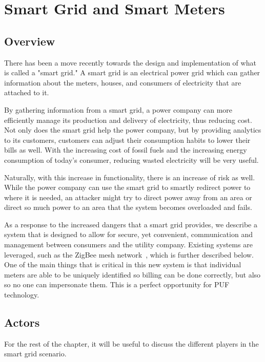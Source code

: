 
\chapter{Smart Grid and Smart Meters}
\label{chapter:doe}

\section{Overview}
There has been a move recently towards the design and implementation of what is called a "smart grid." A smart
grid is an electrical power grid which can gather information about the meters, houses, and consumers of
electricity that are attached to it.


By gathering information from a smart grid, a power company can more efficiently manage its production and delivery
of electricity, thus reducing cost. Not only does the smart grid help the power company, but by providing analytics to
its customers, customers can adjust their consumption habits to lower their bills as well. With the increasing cost of
fossil fuels and the increasing energy consumption of today's consumer, reducing wasted electricity will be very useful.

Naturally, with this increase in functionality, there is an increase of risk as well. While the power company can use
the smart grid to smartly redirect power to where it is needed, an attacker might try to direct power away from an
area or direct so much power to an area that the system becomes overloaded and fails.

As a response to the increased dangers that a smart grid provides, we describe a system that is designed to allow
for secure, yet convenient, communication and management between consumers and the utility company. Existing
systems are leveraged, such as the ZigBee mesh network~\cite{zigbee}, which is further described below.
One of the main things that is critical in this new system is that individual meters are able to be uniquely identified
so billing can be done correctly, but also so no one can impersonate them. This is a perfect opportunity for PUF
technology.

\section{Actors}
For the rest of the chapter, it will be useful to discuss the different players in the smart grid scenario.


